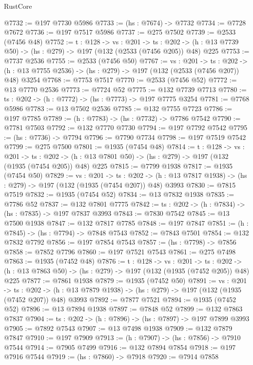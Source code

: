 \begin{lexlean}{RustCore}
\begin{coremodule}
@7732 := @197 @7730 @5986
@7733 := (hs : @7674) -> @7732
@7734 := @7728 @7672
@7736 := @197 @7517 @5986
@7737 := @275 @7502
@7739 := @2533 (@7456 @48)
@7752 := {t : @128} ->
  {vs : @201} ->
  {ts : @202} -> (h : @13 @7739 @50) -> (hs : @279) -> @197 (@132 (@2533 (@7456 @205)) @48) @225
@7753 := @7737 @2536
@7755 := @2533 (@7456 @50)
@7767 := {vs : @201} ->
  {ts : @202} -> (h : @13 @7755 @2536) -> (hs : @279) -> @197 (@132 (@2533 (@7456 @207)) @48) @3254
@7768 := @7753 @7517
@7770 := @2533 (@7456 @52)
@7772 := @13 @7770 @2536
@7773 := @7724 @52
@7775 := @132 @7739 @7713
@7780 := {ts : @202} -> (h : @7772) -> (hs : @7773) -> @197 @7775 @3254
@7781 := @7768 @5986
@7783 := @13 @7502 @2536
@7785 := @132 @7755 @7723
@7786 := @197 @7785
@7789 := (h : @7783) -> (hs : @7732) -> @7786 @7542
@7790 := @7781 @7503
@7792 := @132 @7770 @7730
@7794 := @197 @7792 @7542
@7795 := (hs : @7736) -> @7794
@7796 := @7790 @7734
@7798 := @197 @7519 @7542
@7799 := @275 @7500
@7801 := @1935 (@7454 @48)
@7814 := {t : @128} ->
  {vs : @201} ->
  {ts : @202} -> (h : @13 @7801 @50) -> (hs : @279) -> @197 (@132 (@1935 (@7454 @205)) @48) @225
@7815 := @7799 @1938
@7817 := @1935 (@7454 @50)
@7829 := {vs : @201} ->
  {ts : @202} -> (h : @13 @7817 @1938) -> (hs : @279) -> @197 (@132 (@1935 (@7454 @207)) @48) @3993
@7830 := @7815 @7519
@7832 := @1935 (@7454 @52)
@7834 := @13 @7832 @1938
@7835 := @7786 @52
@7837 := @132 @7801 @7775
@7842 := {ts : @202} -> (h : @7834) -> (hs : @7835) -> @197 @7837 @3993
@7843 := @7830 @7542
@7845 := @13 @7500 @1938
@7847 := @132 @7817 @7785
@7848 := @197 @7847
@7851 := (h : @7845) -> (hs : @7794) -> @7848 @7543
@7852 := @7843 @7501
@7854 := @132 @7832 @7792
@7856 := @197 @7854 @7543
@7857 := (hs : @7798) -> @7856
@7858 := @7852 @7796
@7860 := @197 @7521 @7543
@7861 := @275 @7498
@7863 := @1935 (@7452 @48)
@7876 := {t : @128} ->
  {vs : @201} ->
  {ts : @202} -> (h : @13 @7863 @50) -> (hs : @279) -> @197 (@132 (@1935 (@7452 @205)) @48) @225
@7877 := @7861 @1938
@7879 := @1935 (@7452 @50)
@7891 := {vs : @201} ->
  {ts : @202} -> (h : @13 @7879 @1938) -> (hs : @279) -> @197 (@132 (@1935 (@7452 @207)) @48) @3993
@7892 := @7877 @7521
@7894 := @1935 (@7452 @52)
@7896 := @13 @7894 @1938
@7897 := @7848 @52
@7899 := @132 @7863 @7837
@7904 := {ts : @202} -> (h : @7896) -> (hs : @7897) -> @197 @7899 @3993
@7905 := @7892 @7543
@7907 := @13 @7498 @1938
@7909 := @132 @7879 @7847
@7910 := @197 @7909
@7913 := (h : @7907) -> (hs : @7856) -> @7910 @7544
@7914 := @7905 @7499
@7916 := @132 @7894 @7854
@7918 := @197 @7916 @7544
@7919 := (hs : @7860) -> @7918
@7920 := @7914 @7858

\end{coremodule}
\end{lexlean}
